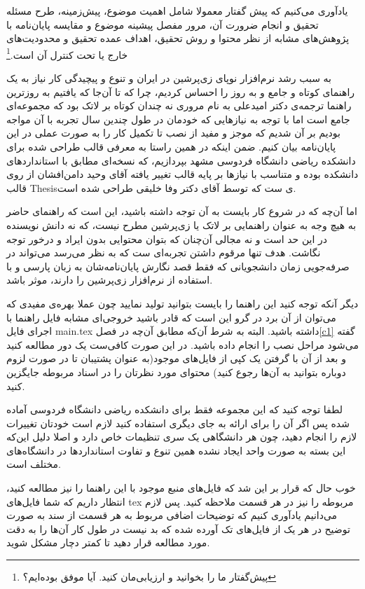 \begin{preface}[مقدمه]
یادآوری می‌کنیم که پیش گفتار معمولا شامل اهمیت موضوع، پیش‌زمینه، طرح مسئله تحقیق و انجام ضرورت آن، مرور مفصل پیشینه موضوع و مقایسه پایان‌نامه با پژوهش‌های مشابه از نظر محتوا و روش تحقیق، اهداف عمده تحقیق و محدودیت‌های خارج یا تحت کنترل آن است.\footnote{پیش‌گفتار ما را بخوانید و ارزیابی‌مان کنید. آیا موفق بوده‌ایم؟}

به سبب رشد نرم‌افزار نوپای زی‌پرشین\LTRfootnote{\XePersian} در ایران و تنوع و پیچیدگی کار نیاز به یک راهنمای کوتاه و جامع و به روز را احساس کردیم، چرا که تا آن‌جا که یافتیم به روزترین راهنما ترجمه‌ی دکتر امیدعلی به نام مروری نه چندان کوتاه بر لاتک بود که مجموعه‌ای جامع است اما با توجه به نیازهایی که خودمان در طول چندین سال تجربه با آن مواجه بودیم بر آن شدیم که موجز و مفید از نصب تا تکمیل کار را به صورت عملی در این پایان‌نامه بیان کنیم. ضمن اینکه در همین راستا به معرفی قالب طراحی شده برای دانشکده ریاضی دانشگاه فردوسی مشهد بپردازیم، که نسخه‌ای مطابق با استانداردهای دانشکده بوده و متناسب با نیازها بر پایه قالب تغییر یافته آقای وحید دامن‌افشان از روی قالب Thesisی ست که توسط آقای دکتر وفا خلیقی طراحی شده است.



اما آن‌چه که در شروع کار بایست به آن توجه داشته باشید، این است که راهنمای حاضر به هیچ وجه به عنوان راهنمایی بر لاتک یا زی‌پرشین مطرح نیست، که نه دانش نویسنده در این حد است و نه مجالی آن‌چنان که بتوان محتوایی بدون ایراد و درخور توجه نگاشت. هدف تنها مرقوم داشتن تجربه‌ای ست که به نظر می‌رسد می‌تواند در صرفه‌جویی زمان دانشجویانی که فقط قصد نگارش پایان‌نامه‌شان به زبان پارسی و با استفاده از نرم‌افزار زی‌پرشین را دارند، موثر باشد.


دیگر آنکه توجه کنید این راهنما را بایست بتوانید تولید نمایید چون عملا بهره‌ی مفیدی که می‌توان از آن برد در گرو این است که قادر باشید خروجی‌ای مشابه فایل راهنما با اجرای فایل main.tex داشته باشید. البته به شرط آن‌که مطابق آن‌چه در فصل\ref{c1} گفته می‌شود مراحل نصب را انجام داده باشید. در این صورت کافی‌ست یک دور مطالعه کنید و بعد از آن با گرفتن یک کپی از فایل‌های موجود(به عنوان پشتیبان تا در صورت لزوم دوباره بتوانید به آن‌ها رجوع کنید) محتوای مورد نظرتان را در اسناد مربوطه جایگزین کنید.


لطفا توجه کنید که این مجموعه فقط برای دانشکده ریاضی دانشگاه فردوسی آماده شده پس اگر آن را برای ارائه به جای دیگری استفاده کنید لازم است خودتان تغییرات لازم را انجام دهید، چون هر دانشگاهی یک سری تنظیمات خاص دارد و اصلا دلیل این‌که این بسته به صورت واحد ایجاد نشده همین تنوع و تفاوت استانداردها در دانشگاه‌های مختلف است.

خوب حال که قرار بر این شد که فایل‌های منبع موجود با این راهنما را نیز مطالعه کنید، انتظار داریم که شما فایل‌های tex مربوطه را نیز در هر قسمت ملاحظه کنید. پس لازم می‌دانیم یادآوری کنیم که توضیحات اضافی مربوط به هر قسمت از سند به صورت توضیح در هر یک از فایل‌های تک آورده شده که بد نیست در طول کار آن‌ها را به دقت مورد مطالعه قرار دهید تا کمتر دچار مشکل شوید.


\end{preface}
